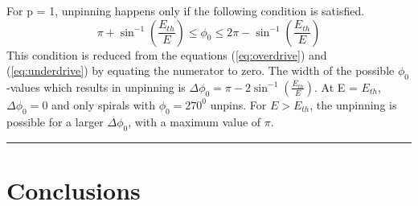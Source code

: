 \documentclass[%
 preprint,
 amsmath,amssymb,
 aps,
]{revtex4-2}
\begin{document}
For p = 1, unpinning happens only if the following condition is satisfied.
\begin{equation}
\pi+ \sin^{-1}(\frac{E_{th}}{E})  \leq \phi_0 \leq 2\pi-\sin^{-1}(\frac{E_{th}}{E})
\label{eq:p=1}
\end{equation}
This condition is reduced from the equations (\ref{eq:overdrive}) and (\ref{eq:underdrive}) by equating the numerator to zero. The width of the possible $\phi_0$-values which results in unpinning is $\Delta\phi_0 = \pi - 2 \sin^{-1}(\frac{E_{th}}{E})$. At E = $E_{th}$, $\Delta\phi_0 = 0$ and only spirals with $\phi_0 = 270^0$ unpins. For $E > E_{th}$, the unpinning is possible for a larger $\Delta\phi_0$, with a maximum value of $\pi$.  




\vspace{5pt}
\hrule
\vspace{5pt}
\section{Conclusions}
\end{document}
